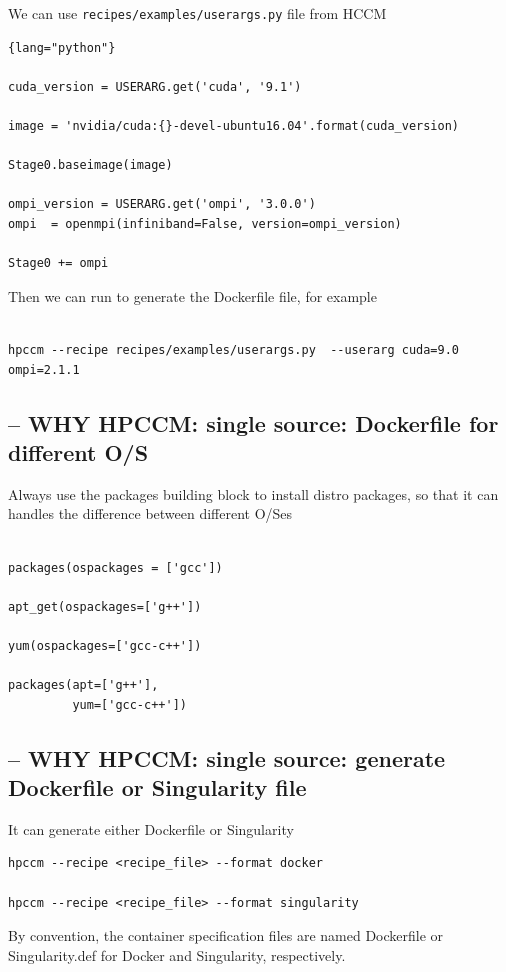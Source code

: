 We can use \verb!recipes/examples/userargs.py! file from HCCM

\begin{lstlisting}{lang="python"}

cuda_version = USERARG.get('cuda', '9.1')

image = 'nvidia/cuda:{}-devel-ubuntu16.04'.format(cuda_version)

Stage0.baseimage(image)

ompi_version = USERARG.get('ompi', '3.0.0')
ompi  = openmpi(infiniband=False, version=ompi_version)

Stage0 += ompi
\end{lstlisting}
Then we can run to generate the Dockerfile file, for example

\begin{verbatim}

hpccm --recipe recipes/examples/userargs.py  --userarg cuda=9.0   ompi=2.1.1
\end{verbatim}

\subsection{-- WHY HPCCM: single source: Dockerfile for different O/S}

Always use the packages building block to install distro packages, so that it can handles the difference between different O/Ses
\begin{verbatim}

packages(ospackages = ['gcc'])

apt_get(ospackages=['g++'])

yum(ospackages=['gcc-c++'])

packages(apt=['g++'],
         yum=['gcc-c++'])

\end{verbatim}

\subsection{-- WHY HPCCM: single source: generate Dockerfile or Singularity file}


It can generate either Dockerfile or Singularity
\begin{verbatim}
hpccm --recipe <recipe_file> --format docker

hpccm --recipe <recipe_file> --format singularity
\end{verbatim}
By convention, the container specification files are named Dockerfile or Singularity.def for Docker and Singularity, respectively. 

